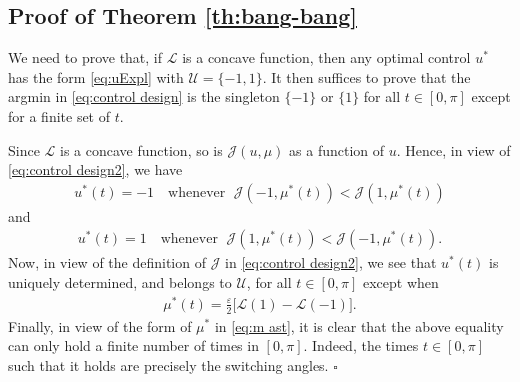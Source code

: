 \documentclass[twocolumn]{autart}    %
\begin{document}
\subsection{Proof of Theorem \ref{th:bang-bang}}\label{proof:bang-bang}

We need to prove that, if $\mathcal{L}$ is a concave function, then any optimal control $u^\ast$ has the form \eqref{eq:uExpl} with $\mathcal{U}=\{-1,1\}$. It then suffices to prove that the argmin in \eqref{eq:control design} is the singleton $\{-1\}$ or $\{1\}$ for all $t\in [0,\pi]$ except for a finite set of $t$.

Since $\mathcal{L}$ is a concave function, so is $\mathcal{J}(u,\mu)$ as a function of $u$. Hence, in view of \eqref{eq:control design2}, we have
\begin{align*} 
	u^\ast (t)= -1  \quad \text{whenever } \; \mathcal{J}(-1,\mu^\ast(t)) <  \mathcal{J}(1,\mu^\ast(t)) 
\end{align*} 
and
\begin{align*}
	u^\ast (t)= 1  \quad \text{whenever } \; \mathcal{J}(1,\mu^\ast(t)) <  \mathcal{J}(-1,\mu^\ast(t)) .
\end{align*}
Now, in view of the definition of $\mathcal{J}$ in \eqref{eq:control design2}, we see that $u^\ast(t)$ is uniquely determined, and belongs to $\mathcal{U}$, for all $t\in [0,\pi]$ except when
\begin{align*}
	\mu^\ast (t) = \frac{\varepsilon}{2} \Big[\mathcal{L}(1) - \mathcal{L}(-1)\Big].
\end{align*}
Finally, in view of the form of $\mu^\ast$ in \eqref{eq:m ast}, it is clear that the above equality can only hold a finite number of times in $[0,\pi]$. Indeed, the times $t\in [0,\pi]$ such that it holds are precisely the switching angles. \hfill $\square$
\end{document}
